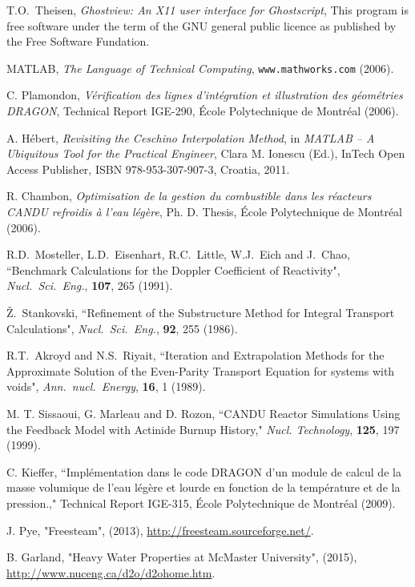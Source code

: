 \begin{thebibliography}{99}
T.O.~Theisen, 
\textsl{Ghostview: An X11 user interface for Ghostscript}, 
This program is free software under the term of the GNU general public licence as
published by the Free Software Fundation.

MATLAB, {\sl The Language of Technical Computing}, {\tt www.mathworks.com} (2006). 

C. Plamondon, {\sl V\'erification des lignes d'int\'egration et illustration des g\'eom\'etries DRAGON}, Technical Report 
IGE-290, \'Ecole Polytechnique de Montr\'eal (2006). 

A. H\'ebert, {\sl Revisiting the Ceschino Interpolation Method}, in {\sl MATLAB -- A Ubiquitous Tool for the Practical
Engineer}, Clara M. Ionescu (Ed.), InTech Open Access Publisher, ISBN 978-953-307-907-3, Croatia, 2011.

R. Chambon, {\sl Optimisation de la gestion du combustible dans les r\'eacteurs
CANDU refroidis \`a l'eau l\'eg\`ere}, Ph. D. Thesis, \'Ecole Polytechnique de Montr\'eal (2006). 

R.D.~Mosteller, L.D.~Eisenhart, R.C.~Little, W.J.~Eich and J.~Chao, ``Benchmark
Calculations for the Doppler Coefficient of Reactivity", {\sl Nucl.~Sci.~Eng.},
{\bf 107}, 265 (1991).

\v{Z}.~Stankovski, ``Refinement of the Substructure Method for Integral
Transport Calculations", {\sl Nucl.~Sci.~Eng.}, {\bf 92}, 255 (1986).

R.T.~Akroyd and N.S.~Riyait, ``Iteration and Extrapolation Methods for the
Approximate Solution of the Even-Parity Transport Equation for systems with
voids", {\sl Ann.~nucl.~Energy}, {\bf 16}, 1 (1989).

M. T. Sissaoui, G. Marleau and D. Rozon, ``CANDU Reactor Simulations Using the
Feedback Model with Actinide Burnup History," {\sl Nucl. Technology}, {\bf 125},
197 (1999).

C. Kieffer, ``Impl\'{e}mentation dans le code DRAGON d'un module de calcul de la masse volumique de l'eau l\'{e}g\`{e}re et lourde en fonction de la temp\'{e}rature et de la pression.," Technical Report IGE-315, \'Ecole Polytechnique de Montr\'eal (2009).

J. Pye, "Freesteam", (2013),
  \url{http://freesteam.sourceforge.net/}.

B. Garland, "Heavy Water Properties at McMaster University", (2015), \url{http://www.nuceng.ca/d2o/d2ohome.htm}.
  

\end{thebibliography}
